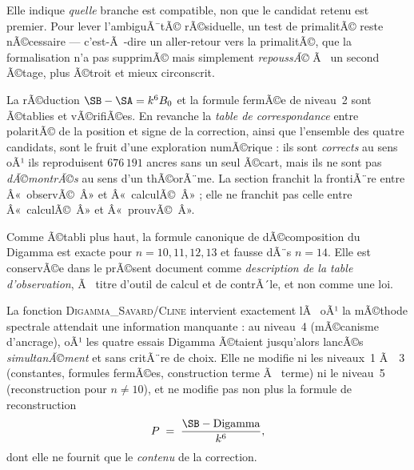 \begin{boitealerte}
Elle indique \emph{quelle} branche est compatible, non que le candidat
retenu est premier. Pour lever l'ambiguÃ¯tÃ© rÃ©siduelle, un test de
primalitÃ© reste nÃ©cessaire --- c'est-Ã -dire un aller-retour vers la
primalitÃ©, que la formalisation n'a pas supprimÃ© mais simplement
\emph{repoussÃ©} Ã  un second Ã©tage, plus Ã©troit et mieux circonscrit.
\end{boitealerte}

\begin{boitealerte}
La rÃ©duction $\SB-\SA = k^{6}B_0$ et la formule fermÃ©e de niveau~2 sont
Ã©tablies et vÃ©rifiÃ©es. En revanche la \emph{table de correspondance}
entre polaritÃ© de la position et signe de la correction, ainsi que
l'ensemble des quatre candidats, sont le fruit d'une exploration
numÃ©rique : ils sont \emph{corrects} au sens oÃ¹ ils reproduisent
$676\,191$ ancres sans un seul Ã©cart, mais ils ne sont pas
\emph{dÃ©montrÃ©s} au sens d'un thÃ©orÃ¨me. La section franchit la
frontiÃ¨re entre Â«~observÃ©~Â» et Â«~calculÃ©~Â» ; elle ne franchit pas celle
entre Â«~calculÃ©~Â» et Â«~prouvÃ©~Â».
\end{boitealerte}

\begin{boitealerte}
Comme Ã©tabli plus haut, la formule canonique de dÃ©composition du
Digamma est exacte pour $n = 10, 11, 12, 13$ et fausse dÃ¨s $n = 14$.
Elle est conservÃ©e dans le prÃ©sent document comme \emph{description
de la table d'observation}, Ã  titre d'outil de calcul et de
contrÃ´le, et non comme une loi.
\end{boitealerte}

\begin{boitenote}
La fonction \textsc{Digamma\_Savard/Cline} intervient exactement lÃ  oÃ¹ la
mÃ©thode spectrale attendait une information manquante : au niveau~4
(mÃ©canisme d'ancrage), oÃ¹ les quatre essais Digamma Ã©taient jusqu'alors
lancÃ©s \emph{simultanÃ©ment} et sans critÃ¨re de choix. Elle ne modifie
ni les niveaux~1 Ã ~3 (constantes, formules fermÃ©es, construction
terme Ã  terme) ni le niveau~5 (reconstruction pour $n \neq 10$), et ne
modifie pas non plus la formule de reconstruction
\[
  P \;=\; \frac{\SB - \mathrm{Digamma}}{k^{6}},
\]
dont elle ne fournit que le \emph{contenu} de la correction.
\end{boitenote}


